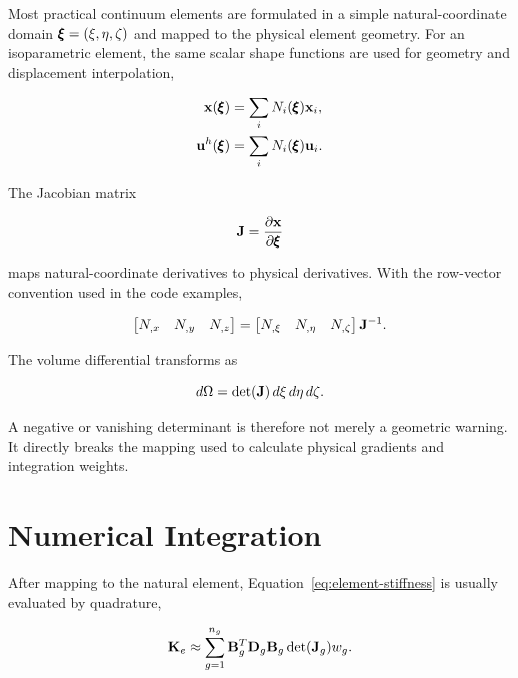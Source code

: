 Most practical continuum elements are formulated in a simple natural-coordinate
domain $\pmb{\xi}=(\xi,\eta,\zeta)$ and mapped to the physical element geometry.
For an isoparametric element, the same scalar shape functions are used for
geometry and displacement interpolation,

\begin{align}
    \mathbf{x}(\pmb{\xi}) &= \sum_iN_i(\pmb{\xi})\mathbf{x}_i,\\
    \mathbf{u}^h(\pmb{\xi}) &= \sum_iN_i(\pmb{\xi})\mathbf{u}_i.
\end{align}

The Jacobian matrix

\begin{equation}\label{eq:isoparametric-jacobian}
    \mathbf{J}
    =\frac{\partial\mathbf{x}}{\partial\pmb{\xi}}
\end{equation}

maps natural-coordinate derivatives to physical derivatives. With the row-vector
convention used in the code examples,

\begin{equation}
    \begin{bmatrix}
        N_{,x}&N_{,y}&N_{,z}
    \end{bmatrix}
    =
    \begin{bmatrix}
        N_{,\xi}&N_{,\eta}&N_{,\zeta}
    \end{bmatrix}
    \mathbf{J}^{-1}.
\end{equation}

The volume differential transforms as

\begin{equation}
    d\Omega=\det(\mathbf{J})\,d\xi\,d\eta\,d\zeta.
\end{equation}

A negative or vanishing determinant is therefore not merely a geometric warning.
It directly breaks the mapping used to calculate physical gradients and
integration weights.

\section{Numerical Integration}

After mapping to the natural element, Equation~\eqref{eq:element-stiffness} is
usually evaluated by quadrature,

\begin{equation}
    \mathbf{K}_e
    \approx
    \sum_{g=1}^{n_g}
    \mathbf{B}_g^T\mathbf{D}_g\mathbf{B}_g
    \det(\mathbf{J}_g)w_g.
\end{equation}

